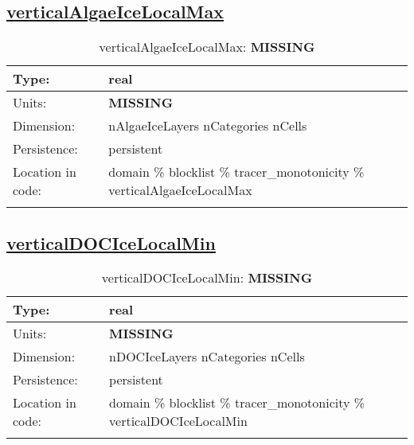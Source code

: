 \subsection[verticalAlgaeIceLocalMax]{\hyperref[sec:var_tab_tracer_monotonicity]{verticalAlgaeIceLocalMax}}
\label{subsec:var_sec_tracer_monotonicity_verticalAlgaeIceLocalMax}
\begin{center}
\begin{longtable}{| p{2.0in} | p{4.0in} |}
        \hline 
        Type: & real \\
        \hline 
        Units: & {\bf \color{red} MISSING} \\
        \hline 
        Dimension: & nAlgaeIceLayers nCategories nCells \\
        \hline 
        Persistence: & persistent \\
        \hline 
         Location in code: & domain \% blocklist \% tracer\_monotonicity \% verticalAlgaeIceLocalMax \\
         \hline 
    \caption{verticalAlgaeIceLocalMax: {\bf \color{red} MISSING}}
\end{longtable}
\end{center}
\subsection[verticalDOCIceLocalMin]{\hyperref[sec:var_tab_tracer_monotonicity]{verticalDOCIceLocalMin}}
\label{subsec:var_sec_tracer_monotonicity_verticalDOCIceLocalMin}
\begin{center}
\begin{longtable}{| p{2.0in} | p{4.0in} |}
        \hline 
        Type: & real \\
        \hline 
        Units: & {\bf \color{red} MISSING} \\
        \hline 
        Dimension: & nDOCIceLayers nCategories nCells \\
        \hline 
        Persistence: & persistent \\
        \hline 
         Location in code: & domain \% blocklist \% tracer\_monotonicity \% verticalDOCIceLocalMin \\
         \hline 
    \caption{verticalDOCIceLocalMin: {\bf \color{red} MISSING}}
\end{longtable}
\end{center}
